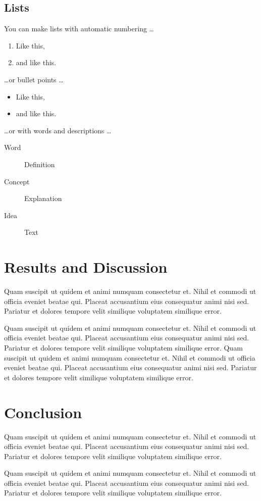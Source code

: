 \documentclass{article}
\begin{document}
\subsection{Lists}

You can make lists with automatic numbering \dots

\begin{enumerate}[noitemsep] 
\item Like this,
\item and like this.
\end{enumerate}
\dots or bullet points \dots
\begin{itemize}[noitemsep] 
\item Like this,
\item and like this.
\end{itemize}
\dots or with words and descriptions \dots
\begin{description}
\item[Word] Definition
\item[Concept] Explanation
\item[Idea] Text
\end{description}

\section{Results and Discussion}
Quam suscipit ut quidem et animi numquam consectetur et. Nihil et commodi ut officia eveniet beatae qui. Placeat accusantium eius consequatur animi nisi sed. Pariatur et dolores tempore velit similique voluptatem similique error.

Quam suscipit ut quidem et animi numquam consectetur et. Nihil et commodi ut officia eveniet beatae qui. Placeat accusantium eius consequatur animi nisi sed. Pariatur et dolores tempore velit similique voluptatem similique error. Quam suscipit ut quidem et animi numquam consectetur et. Nihil et commodi ut officia eveniet beatae qui. Placeat accusantium eius consequatur animi nisi sed. Pariatur et dolores tempore velit similique voluptatem similique error.

\section{Conclusion}

Quam suscipit ut quidem et animi numquam consectetur et. Nihil et commodi ut officia eveniet beatae qui. Placeat accusantium eius consequatur animi nisi sed. Pariatur et dolores tempore velit similique voluptatem similique error.

Quam suscipit ut quidem et animi numquam consectetur et. Nihil et commodi ut officia eveniet beatae qui. Placeat accusantium eius consequatur animi nisi sed. Pariatur et dolores tempore velit similique voluptatem similique error.
\end{document}
